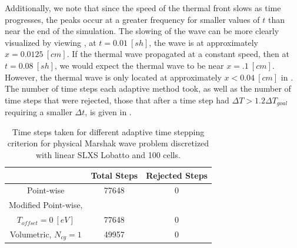 Additionally, we note that since the speed of the thermal front slows as time progresses, the peaks occur at a greater frequency for smaller values of $t$ than near the end of the simulation.
The slowing of the wave can be more clearly visualized by viewing , at $t=0.01 ~[sh]$, the wave is at approximately $x=0.0125~[cm]$.
If the thermal wave propagated at a constant speed, then at $t=0.08~[sh]$, we would expect the thermal wave to be near $x= .1~[cm]$.  However, the thermal wave is only located at approximately $x<0.04~[cm]$ in .
The number of time steps each adaptive method took, as well as the number of time steps that were rejected, those that after a time step had $\Delta T > 1.2 \Delta T_{goal}$ requiring a smaller $\Delta t$, is given in . 
\begin{table}[!htp]
\centering
\caption{Time steps taken for different adaptive time stepping criterion for physical Marshak wave problem discretized with linear SLXS Lobatto and 100 cells.}
\label{tbl:p1_steps}
\begin{tabular}{|c|c|c|}
\hline
{} &  Total Steps & Rejected Steps \\
\hline
Point-wise & 77648 & 0 \\
\hline
Modified Point-wise, &    &  \\
$T_{offset} = 0~[eV]$ &  77648  &  0\\
\hline
Volumetric, $N_{cg} = 1$ & 49957   & 0\\
\hline
\end{tabular}
\end{table}

